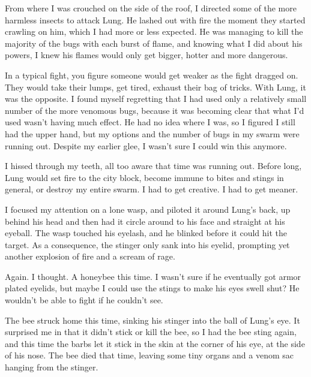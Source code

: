 From where I was crouched on the side of the roof, I directed some of the more harmless insects to attack Lung.  He lashed out with fire the moment they started crawling on him, which I had more or less expected.  He was managing to kill the majority of the bugs with each burst of flame, and knowing what I did about his powers, I knew his flames would only get bigger, hotter and more dangerous.



In a typical fight, you figure someone would get weaker as the fight dragged on.  They would take their lumps, get tired, exhaust their bag of tricks.  With Lung, it was the opposite.  I found myself regretting that I had used only a relatively small number of the more venomous bugs, because it was becoming clear that what I'd used wasn't having much effect.  He had no idea where I was, so I figured I still had the upper hand, but my options and the number of bugs in my swarm were running out.  Despite my earlier glee, I wasn't sure I could win this anymore.



I hissed through my teeth, all too aware that time was running out.  Before long, Lung would set fire to the city block, become immune to bites and stings in general, or destroy my entire swarm.  I had to get creative.  I had to get meaner.



I focused my attention on a lone wasp, and piloted it around Lung's back, up behind his head and then had it circle around to his face and straight at his eyeball.  The wasp touched his eyelash, and he blinked before it could hit the target.  As a consequence, the stinger only sank into his eyelid, prompting yet another explosion of fire and a scream of rage.



Again. I thought.  A honeybee this time.  I wasn't sure if he eventually got armor plated eyelids, but maybe I could use the stings to make his eyes swell shut?  He wouldn't be able to fight if he couldn't see.



The bee struck home this time, sinking his stinger into the ball of Lung's eye.  It surprised me in that it didn't stick or kill the bee, so I had the bee sting again, and this time the barbs let it stick in the skin at the corner of his eye, at the side of his nose.  The bee died that time, leaving some tiny organs and a venom sac hanging from the stinger.



